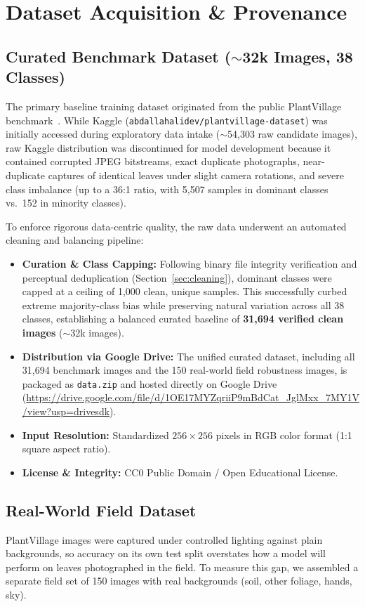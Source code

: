 \section{Dataset Acquisition \& Provenance}
\label{sec:dataset}

\subsection{Curated Benchmark Dataset (\texorpdfstring{$\sim$}{~}32k Images, 38 Classes)}
The primary baseline training dataset originated from the public PlantVillage benchmark~\cite{plantvillage}. While Kaggle (\texttt{abdallahalidev/plantvillage-dataset}) was initially accessed during exploratory data intake ($\sim$54,303 raw candidate images), raw Kaggle distribution was discontinued for model development because it contained corrupted JPEG bitstreams, exact duplicate photographs, near-duplicate captures of identical leaves under slight camera rotations, and severe class imbalance (up to a 36:1 ratio, with 5,507 samples in dominant classes vs.\ 152 in minority classes). 

To enforce rigorous data-centric quality, the raw data underwent an automated cleaning and balancing pipeline:
\begin{itemize}
    \item \textbf{Curation \& Class Capping:} Following binary file integrity verification and perceptual deduplication (Section~\ref{sec:cleaning}), dominant classes were capped at a ceiling of 1,000 clean, unique samples. This successfully curbed extreme majority-class bias while preserving natural variation across all 38 classes, establishing a balanced curated baseline of \textbf{31,694 verified clean images} ($\sim$32k images).
    \item \textbf{Distribution via Google Drive:} The unified curated dataset, including all 31,694 benchmark images and the 150 real-world field robustness images, is packaged as \texttt{data.zip} and hosted directly on Google Drive (\url{https://drive.google.com/file/d/1OE17MYZqriiP9mBdCat_JglMxx_7MY1V/view?usp=drivesdk}).
    \item \textbf{Input Resolution:} Standardized $256\times256$ pixels in RGB color format (1:1 square aspect ratio).
    \item \textbf{License \& Integrity:} CC0 Public Domain / Open Educational License.
\end{itemize}

\subsection{Real-World Field Dataset}
\label{sec:field}
PlantVillage images were captured under controlled lighting against plain backgrounds, so accuracy on its own test split overstates how a model will perform on leaves photographed in the field. To measure this gap, we assembled a separate field set of 150 images with real backgrounds (soil, other foliage, hands, sky).

